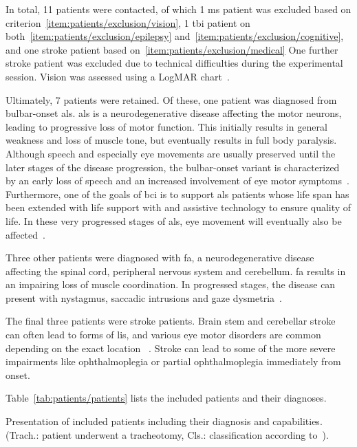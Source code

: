 In total, 11 patients were contacted, of which 1 \ac{ms} patient was excluded based on
criterion~\ref{item:patients/exclusion/vision}, 1 \ac{tbi} patient on
both~\ref{item:patients/exclusion/epilepsy}
and~\ref{item:patients/exclusion/cognitive}, and one stroke patient based
on~\ref{item:patients/exclusion/medical}
One further stroke patient was excluded due to technical
difficulties during the experimental session.
Vision was assessed using a LogMAR chart~\cite{Bailey1976}.

Ultimately, 7 patients were retained.
Of these, one patient was diagnosed from bulbar-onset \ac{als}.
\ac{als} is a neurodegenerative disease affecting the motor neurons, leading to
progressive loss of motor function.
This initially results in general weakness and loss of muscle tone, but
eventually results in full body paralysis.
Although speech and especially eye movements are usually preserved until the
later stages of the disease progression, the bulbar-onset variant is
characterized by an early loss of speech and an increased involvement of eye
motor symptoms~\cite{Guo2022}.
Furthermore, one of the goals of \ac{bci} is to support \ac{als} patients whose
life span has been extended with life support with and assistive technology to
ensure quality of life.
In these very progressed stages of \ac{als}, eye movement will eventually also
be affected~\cite{Hayashi1991}.

Three other patients were diagnosed with \ac{fa}, a neurodegenerative
disease affecting the
spinal cord, peripheral nervous system and cerebellum.
\ac{fa} results in an impairing loss of muscle coordination.
In progressed stages, the disease can present with nystagmus, saccadic
intrusions and gaze dysmetria~\cite{Cook2017}.

The final three patients were stroke patients.
Brain stem and cerebellar stroke can often lead to forms of \ac{lis}, and
various eye motor disorders are common depending on the exact location
~\cite{Bogousslavsky1987, Moncayo2009}.
Stroke can lead to some of the more severe impairments like ophthalmoplegia or
partial ophthalmoplegia immediately from onset.

Table~\ref{tab:patients/patients} lists the included patients and their
diagnoses.

\begin{table}[t]
  \centering
  \footnotesize
  
  \caption{Presentation of included patients including their diagnosis and
  capabilities. (Trach.: patient underwent a tracheotomy, Cls.: classification according to~\textcite{Wolpaw2006}).
  }
  \label{tab:patients/patients}
\end{table}

